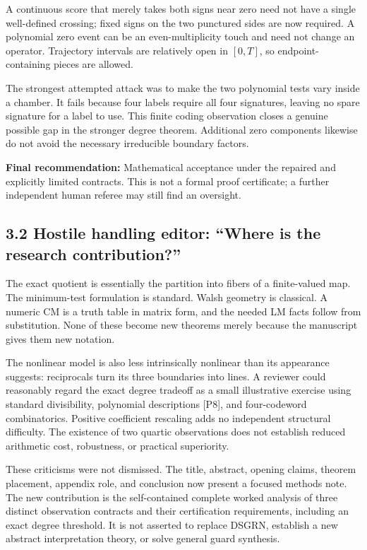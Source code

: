 \documentclass[
  11pt,
]{article}
\begin{document}
A continuous score that merely takes both signs near zero need not have
a single well-defined crossing; fixed signs on the two punctured sides
are now required. A polynomial zero event can be an even-multiplicity
touch and need not change an operator. Trajectory intervals are
relatively open in \([0,T]\), so endpoint-containing pieces are allowed.

The strongest attempted attack was to make the two polynomial tests vary
inside a chamber. It fails because four labels require all four
signatures, leaving no spare signature for a label to use. This finite
coding observation closes a genuine possible gap in the stronger degree
theorem. Additional zero components likewise do not avoid the necessary
irreducible boundary factors.

\textbf{Final recommendation:} Mathematical acceptance under the
repaired and explicitly limited contracts. This is not a formal proof
certificate; a further independent human referee may still find an
oversight.

\subsection{3.2 Hostile handling editor: ``Where is the research
contribution?''}\label{hostile-handling-editor-where-is-the-research-contribution}

The exact quotient is essentially the partition into fibers of a
finite-valued map. The minimum-test formulation is standard. Walsh
geometry is classical. A numeric CM is a truth table in matrix form, and
the needed LM facts follow from substitution. None of these become new
theorems merely because the manuscript gives them new notation.

The nonlinear model is also less intrinsically nonlinear than its
appearance suggests: reciprocals turn its three boundaries into lines. A
reviewer could reasonably regard the exact degree tradeoff as a small
illustrative exercise using standard divisibility, polynomial
descriptions {[}P8{]}, and four-codeword combinatorics. Positive
coefficient rescaling adds no independent structural difficulty. The
existence of two quartic observations does not establish reduced
arithmetic cost, robustness, or practical superiority.

These criticisms were not dismissed. The title, abstract, opening
claims, theorem placement, appendix role, and conclusion now present a
focused methods note. The new contribution is the self-contained
complete worked analysis of three distinct observation contracts and
their certification requirements, including an exact degree threshold.
It is not asserted to replace DSGRN, establish a new abstract
interpretation theory, or solve general guard synthesis.
\end{document}
